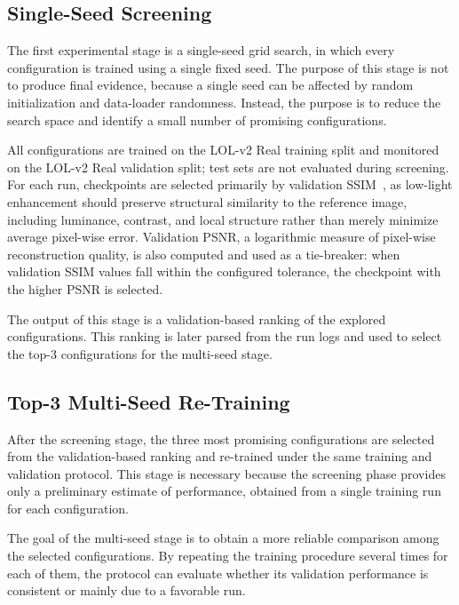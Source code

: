 

\subsection{Single-Seed Screening}

The first experimental stage is a single-seed grid search, in which every configuration is trained using a single fixed seed. The purpose of this stage is not to produce final evidence, because a single seed can be affected by random initialization and data-loader randomness. Instead, the purpose is to reduce the search space and identify a small number of promising configurations.

All configurations are trained on the LOL-v2 Real training split and monitored on the LOL-v2 Real validation split; test sets are not evaluated during screening. For each run, checkpoints are selected primarily by validation SSIM~\cite{DBLP:journals/tip/WangBSS04}, as low-light enhancement should preserve structural similarity to the reference image, including luminance, contrast, and local structure rather than merely minimize average pixel-wise error. Validation PSNR, a logarithmic measure of pixel-wise reconstruction quality, is also computed and used as a tie-breaker: when validation SSIM values fall within the configured tolerance, the checkpoint with the higher PSNR is selected.

The output of this stage is a validation-based ranking of the explored configurations. This ranking is later parsed from the run logs and used to select the top-3 configurations for the multi-seed stage.

\subsection{Top-3 Multi-Seed Re-Training}

After the screening stage, the three most promising configurations are selected from the validation-based ranking and re-trained under the same training and validation protocol. This stage is necessary because the screening phase provides only a preliminary estimate of performance, obtained from a single training run for each configuration.

The goal of the multi-seed stage is to obtain a more reliable comparison among the selected configurations. By repeating the training procedure several times for each of them, the protocol can evaluate whether its validation performance is consistent or mainly due to a favorable run.

